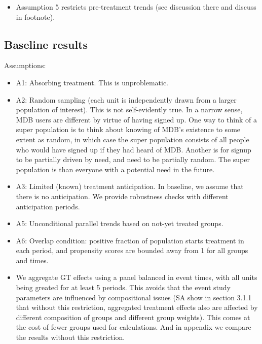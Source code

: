 \begin{itemize}
    \item Assumption 5 restricts pre-treatment trends (see discussion there and
        discuss in footnote).

\end{itemize}


\subsection{Baseline results}%
\label{sub:baseline_results}


Assumptions:
\begin{itemize}
    \item A1: Absorbing treatment. This is unproblematic.

    \item A2: Random sampling (each unit is independently drawn from a larger
        population of interest). This is not self-evidently true. In a narrow
        sense, MDB users are different by virtue of having signed up. One way
        to think of a super population is to think about knowing of MDB's
        existence to some extent as random, in which case the super population
        consists of all people who would have signed up if they had heard of
        MDB. Another is for signup to be partially driven by need, and need to
        be partially random. The super population is than everyone with a
        potential need in the future.

    \item A3: Limited (known) treatment anticipation. In baseline, we assume
        that there is no anticipation. We provide robustness checks with
        different anticipation periods.

    \item A5: Unconditional parallel trends based on not-yet treated groups.

    \item A6: Overlap condition: positive fraction of population starts
        treatment in each period, and propensity scores are bounded away from 1
        for all groups and times.

    \item We aggregate GT effects using a panel balanced in event times, with
        all units being greated for at least 5 periods. This avoids that the
        event study parameters are influenced by compositional issues (SA show
        in section 3.1.1 that without this restriction, aggregated treatment
        effects also are affected by different composition of groups and
        different group weights). This comes at the cost of fewer groups used
        for calculations. And in appendix we compare the results without this
        restriction.
\end{itemize} 

